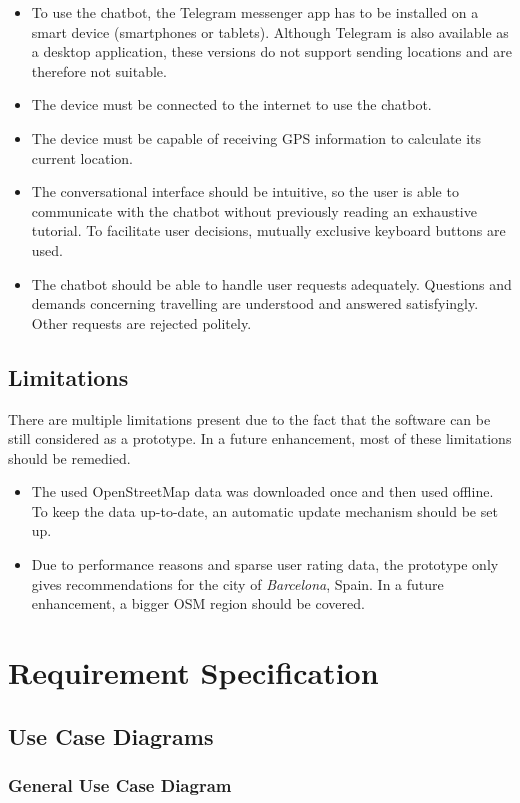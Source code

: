 \begin{itemize}
\item To use the chatbot, the Telegram messenger app has to be installed on a smart device (smartphones or tablets). Although Telegram is also available as a desktop application, these versions do not support sending locations and are therefore not suitable.
\item The device must be connected to the internet to use the chatbot.
\item The device must be capable of receiving GPS information to calculate its current location. 
\item The conversational interface should be intuitive, so the user is able to communicate with the chatbot without previously reading an exhaustive tutorial. To facilitate user decisions, mutually exclusive keyboard buttons are used.
\item The chatbot should be able to handle user requests adequately. Questions and demands concerning travelling are understood and answered satisfyingly. Other requests are rejected politely.
\end{itemize}

\subsection{Limitations}
There are multiple limitations present due to the fact that the software can be still considered as a prototype. In a future enhancement, most of these limitations should be remedied.
\begin{itemize}
\item The used OpenStreetMap data was downloaded once and then used offline. To keep the data up-to-date, an automatic update mechanism should be set up.
\item Due to performance reasons and sparse user rating data, the prototype only gives recommendations for the city of \textit{Barcelona}, Spain. In a future enhancement, a bigger OSM region should be covered.
\end{itemize}
\pagebreak

\section{Requirement Specification}
\subsection{Use Case Diagrams}
\subsubsection{General Use Case Diagram}

